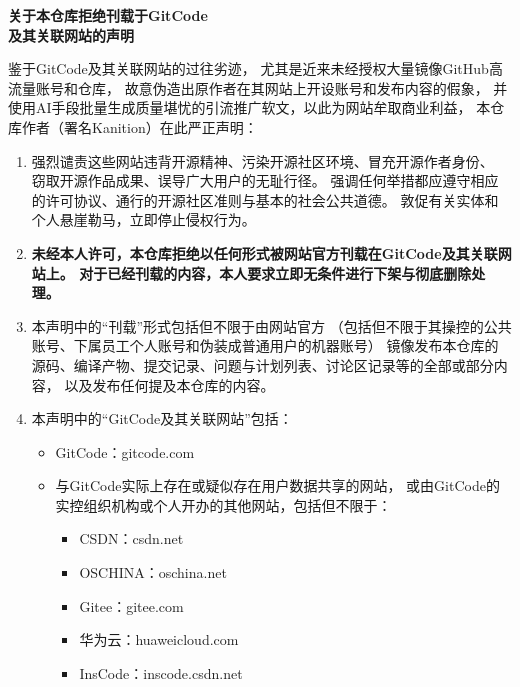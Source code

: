 \begin{center}
      {\LARGE\bfseries 关于本仓库拒绝刊载于GitCode\\及其关联网站的声明}
\end{center}\vspace{30pt}

鉴于GitCode及其关联网站的过往劣迹，
尤其是近来未经授权大量镜像GitHub高流量账号和仓库，
故意伪造出原作者在其网站上开设账号和发布内容的假象，
并使用AI手段批量生成质量堪忧的引流推广软文，以此为网站牟取商业利益，
本仓库作者（署名Kanition）在此严正声明：

\begin{enumerate}
      \item 强烈谴责这些网站违背开源精神、污染开源社区环境、冒充开源作者身份、
            窃取开源作品成果、误导广大用户的无耻行径。
            强调任何举措都应遵守相应的许可协议、通行的开源社区准则与基本的社会公共道德。
            敦促有关实体和个人悬崖勒马，立即停止侵权行为。
      \item {\bfseries 未经本人许可，本仓库拒绝以任何形式被网站官方刊载在GitCode及其关联网站上。
            对于已经刊载的内容，本人要求立即无条件进行下架与彻底删除处理。}
      \item 本声明中的“刊载”形式包括但不限于由网站官方
            （包括但不限于其操控的公共账号、下属员工个人账号和伪装成普通用户的机器账号）
            镜像发布本仓库的源码、编译产物、提交记录、问题与计划列表、讨论区记录等的全部或部分内容，
            以及发布任何提及本仓库的内容。
      \item 本声明中的“GitCode及其关联网站”包括：
            \begin{itemize}
                  \item GitCode：gitcode.com
                  \item 与GitCode实际上存在或疑似存在用户数据共享的网站，
                        或由GitCode的实控组织机构或个人开办的其他网站，包括但不限于：
                        \begin{itemize}
                              \item CSDN：csdn.net
                              \item OSCHINA：oschina.net
                              \item Gitee：gitee.com
                              \item 华为云：huaweicloud.com
                              \item InsCode：inscode.csdn.net
                        \end{itemize}

\end{itemize}
\end{enumerate}
